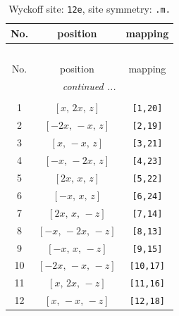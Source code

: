 \documentclass[fleqn,8pt]{jsarticle}
\begin{document}
\begin{longtable}{ccc}
\caption{Wyckoff site: {\tt 12e}, site symmetry: {\tt .m.}}
 \\
 \hline \hline
No. & position & mapping \\ \hline \endfirsthead

\multicolumn{2}{l}{\tablename\ \thetable{}} \\
 \hline \hline
No. & position & mapping \\ \hline \endhead

 \hline \hline
\multicolumn{2}{r}{\footnotesize\it continued ...} \\ \endfoot

 \hline \hline
\multicolumn{2}{r}{} \\ \endlastfoot

1 & $\left[ x,\, 2 x,\, z \right]$ & {\tt [1,20]} \\ \hline
2 & $\left[ - 2 x,\, - x,\, z \right]$ & {\tt [2,19]} \\ \hline
3 & $\left[ x,\, - x,\, z \right]$ & {\tt [3,21]} \\ \hline
4 & $\left[ - x,\, - 2 x,\, z \right]$ & {\tt [4,23]} \\ \hline
5 & $\left[ 2 x,\, x,\, z \right]$ & {\tt [5,22]} \\ \hline
6 & $\left[ - x,\, x,\, z \right]$ & {\tt [6,24]} \\ \hline
7 & $\left[ 2 x,\, x,\, - z \right]$ & {\tt [7,14]} \\ \hline
8 & $\left[ - x,\, - 2 x,\, - z \right]$ & {\tt [8,13]} \\ \hline
9 & $\left[ - x,\, x,\, - z \right]$ & {\tt [9,15]} \\ \hline
10 & $\left[ - 2 x,\, - x,\, - z \right]$ & {\tt [10,17]} \\ \hline
11 & $\left[ x,\, 2 x,\, - z \right]$ & {\tt [11,16]} \\ \hline
12 & $\left[ x,\, - x,\, - z \right]$ & {\tt [12,18]} \\
\end{longtable}
\renewcommand{\arraystretch}{1.2}
\end{document}
